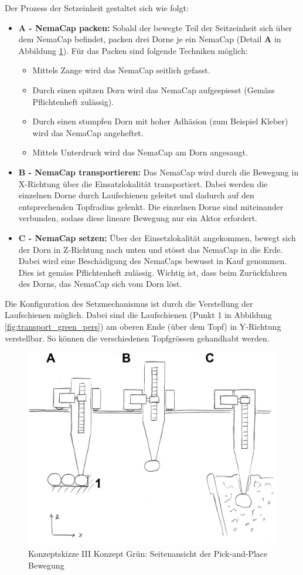 Der Prozess der Setzeinheit gestaltet sich wie folgt:
\begin{itemize}
	\item \textbf{A - NemaCap packen:} Sobald der bewegte Teil der Seitzeinheit sich über dem NemaCap befindet, packen drei Dorne je ein NemaCap (Detail \textbf{A} in Abbildung \ref{fig:transport_green_side}). Für das Packen sind folgende Techniken möglich:
	\begin{itemize}
		\item Mittels Zange wird das NemaCap seitlich gefasst.
		\item Durch einen spitzen Dorn wird das NemaCap aufgespiesst (Gemäss Pflichtenheft zulässig).
		\item Durch einen stumpfen Dorn mit hoher Adhäsion (zum Beispiel Kleber) wird das NemaCap angeheftet.
		\item Mittels Unterdruck wird das NemaCap am Dorn angesaugt.
	\end{itemize} 
	\item \textbf{B - NemaCap transportieren:} Das NemaCap wird durch die Bewegung in X-Richtung über die Einsatzlokalität transportiert. Dabei werden die einzelnen Dorne durch Laufschienen geleitet und dadurch auf den entsprechenden Topfradius gelenkt. Die einzelnen Dorne sind miteinander verbunden, sodass diese lineare Bewegung nur ein Aktor erfordert.
	
	\item \textbf{C - NemaCap setzen:} 
	Über der Einsetzlokalität angekommen, bewegt sich der Dorn in Z-Richtung nach unten und stösst das NemaCap in die Erde. Dabei wird eine Beschädigung des NemaCaps bewusst in Kauf genommen. Dies ist gemäss Pflichtenheft zulässig. Wichtig ist, dass beim Zurückfahren des Dorns,  das NemaCap sich vom Dorn löst.
\end{itemize}
Die Konfiguration des Setzmechanismus ist durch die Verstellung der Laufschienen möglich. Dabei sind die Laufschienen (Punkt 1 in Abbildung \ref{fig:transport_green_pers}) am oberen Ende (über dem Topf) in Y-Richtung verstellbar. So können die verschiedenen Topfgrössen gehandhabt werden.

\begin{figure}[H]
	\includegraphics[scale=0.6]{Illustrationen/5-Konzept/green_2Dmachine_seite.jpg}
	\caption{Konzeptskizze III Konzept Grün: Seitenansicht der Pick-and-Place Bewegung}
	\label{fig:transport_green_side}
\end{figure}